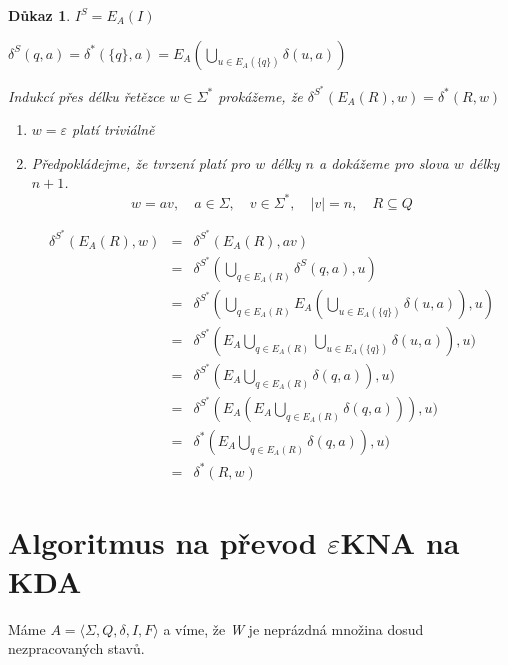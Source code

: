 \documentclass[10pt, a4paper, titlepage]{article}
\theoremstyle{note}
\newtheorem{dukaz}{\textbf{Důkaz}}
\begin{document}
 \begin{dukaz}
 $I^S=E_A(I)$
 
 $\delta^S(q,a)=\delta^*(\lbrace q \rbrace , a)= E_A(\bigcup_{u \in E_A(\lbrace q \rbrace )} \delta(u,a))$ 
 
 Indukcí přes délku řetězce $w \in \Sigma^*$ prokážeme, že $ \delta^{S^*} (E_A(R),w)=\delta^*(R,w)$
 
 \begin{enumerate}
 \item
 $w=\varepsilon$ platí triviálně
 \item
 Předpokládejme, že tvrzení platí pro $w$ délky $n$ a dokážeme pro slova $w$ délky $n+1$.
$$
w = av, \quad a \in \Sigma, \quad v \in \Sigma^*, \quad |v|=n, \quad R \subseteq Q
$$ 
 
 \begin{eqnarray*}
	\delta^{S^*} (E_A(R),w) &=& \delta^{S^*} (E_A(R),av) \\
	&=& \delta^{S^*} (\bigcup_{q \in E_A(R)} \delta^S(q,a), u) \\
	&=& \delta^{S^*} (\bigcup_{q \in E_A(R)} E_A(\bigcup_{u \in E_A(\lbrace q \rbrace)} \delta (u,a)),u) \\
	&=& \delta^{S^*} (E_{A} \bigcup_{q \in E_A(R)} \bigcup_{u \in E_A(\lbrace q \rbrace)} \delta (u,a)),u) \\
	&=& \delta^{S^*} (E_{A} \bigcup_{q \in E_A(R)} \delta (q,a)),u) \\
	&=& \delta^{S^*} (E_{A} (E_{A} \bigcup_{q \in E_A(R)} \delta (q,a))),u) \\
	&=& \delta^{*} (E_{A} \bigcup_{q \in E_A(R)} \delta (q,a)),u) \\
	&=& \delta^{*} (R, w)
 \end{eqnarray*}
 \end{enumerate} 
 \end{dukaz}

\section{Algoritmus na převod $\varepsilon$KNA na KDA}

Máme $A = \langle \Sigma, Q, \delta, I, F \rangle$ a víme, že \emph{W} je neprázdná množina dosud nezpracovaných stavů.
\end{document}
